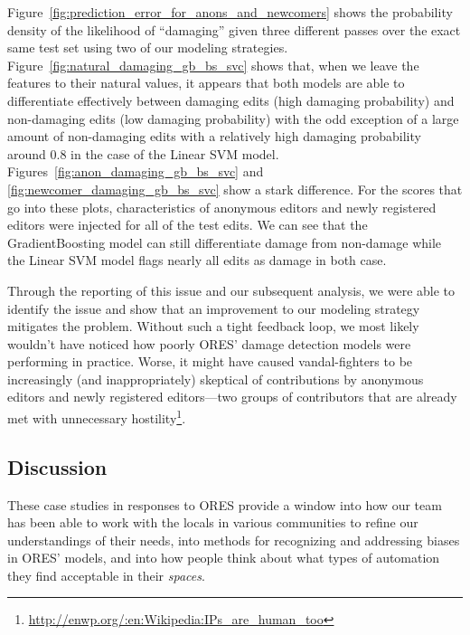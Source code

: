 

Figure~\ref{fig:prediction_error_for_anons_and_newcomers} shows the probability density of the likelihood of ``damaging'' given three different passes over the exact same test set using two of our modeling strategies.  Figure~\ref{fig:natural_damaging_gb_bs_svc} shows that, when we leave the features to their natural values, it appears that both models are able to differentiate effectively between damaging edits (high damaging probability) and non-damaging edits (low damaging probability) with the odd exception of a large amount of non-damaging edits with a relatively high damaging probability around 0.8 in the case of the Linear SVM model.  Figures~\ref{fig:anon_damaging_gb_bs_svc} and \ref{fig:newcomer_damaging_gb_bs_svc} show a stark difference.  For the scores that go into these plots, characteristics of anonymous editors and newly registered editors were injected for all of the test edits.  We can see that the GradientBoosting model can still differentiate damage from non-damage while the Linear SVM model flags nearly all edits as damage in both case.

Through the reporting of this issue and our subsequent analysis, we were able to identify the issue and show that an improvement to our modeling strategy mitigates the problem.  Without such a tight feedback loop, we most likely wouldn't have noticed how poorly ORES' damage detection models were performing in practice.  Worse, it might have caused vandal-fighters to be increasingly (and inappropriately) skeptical of contributions by anonymous editors and newly registered editors---two groups of contributors that are already met with unnecessary hostility\footnote{\url{http://enwp.org/:en:Wikipedia:IPs\_are\_human\_too}}\cite{halfaker2013rise}.

\subsection{Discussion}
These case studies in responses to ORES provide a window into how our team has been able to work with the locals in various communities to refine our understandings of their needs, into methods for recognizing and addressing biases in ORES' models, and into how people think about what types of automation they find acceptable in their \emph{spaces}.

